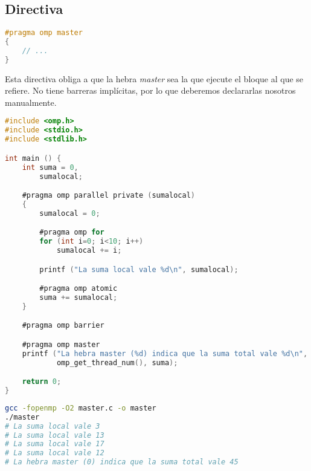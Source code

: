 \pagebreak

\subsection{Directiva }\label{directivas-openmp-directivas}

\begin{lstlisting}[language=C]
#pragma omp master
{
	// ...
}
\end{lstlisting}

Esta directiva obliga a que la hebra \textit{master} sea la que ejecute el bloque al que se refiere.
No tiene barreras implícitas, por lo que deberemos declararlas nosotros manualmente.

\begin{lstlisting}[language=C]
#include <omp.h>
#include <stdio.h>
#include <stdlib.h>

int main () {
	int suma = 0,
	    sumalocal;

	#pragma omp parallel private (sumalocal)
	{
		sumalocal = 0;

		#pragma omp for
		for (int i=0; i<10; i++)
			sumalocal += i;

		printf ("La suma local vale %d\n", sumalocal);

		#pragma omp atomic
		suma += sumalocal;
	}

	#pragma omp barrier

	#pragma omp master
	printf ("La hebra master (%d) indica que la suma total vale %d\n",
	        omp_get_thread_num(), suma);

	return 0;
}
\end{lstlisting}

\begin{lstlisting}[language=sh]
gcc -fopenmp -O2 master.c -o master
./master
# La suma local vale 3
# La suma local vale 13
# La suma local vale 17
# La suma local vale 12
# La hebra master (0) indica que la suma total vale 45
\end{lstlisting}
